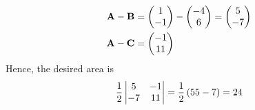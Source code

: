 
\begin{align}
  \mathbf{A}-\mathbf{B} &= \begin{pmatrix}1\\-1\end{pmatrix}-\begin{pmatrix}-4\\6\end{pmatrix} = \begin{pmatrix}5\\-7\end{pmatrix}
  \\
  \mathbf{A}-\mathbf{C} &= \begin{pmatrix}-1\\11\end{pmatrix}
\end{align}
%
Hence, the desired area is 
\begin{align}
  \frac{1}{2} \begin{vmatrix}5 & -1\\-7 & 11 \end{vmatrix}
  =\frac{1}{2}\left(55 -7\right) = 24
\end{align}
